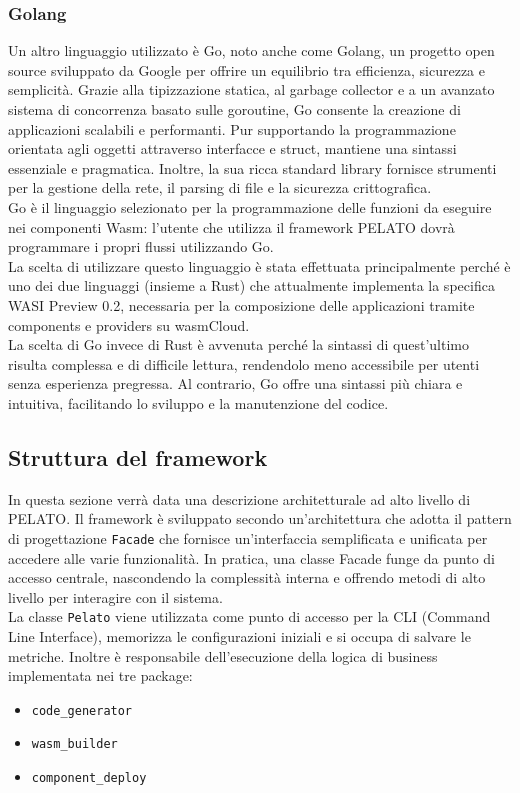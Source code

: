 \subsubsection{Golang}

Un altro linguaggio utilizzato è Go, noto anche come Golang, un progetto open source sviluppato da Google per offrire un equilibrio tra efficienza, sicurezza e semplicità. Grazie alla tipizzazione statica, al garbage collector e a un avanzato sistema di concorrenza basato sulle goroutine, Go consente la creazione di applicazioni scalabili e performanti. Pur supportando la programmazione orientata agli oggetti attraverso interfacce e struct, mantiene una sintassi essenziale e pragmatica. Inoltre, la sua ricca standard library fornisce strumenti per la gestione della rete, il parsing di file e la sicurezza crittografica.\\
Go è il linguaggio selezionato per la programmazione delle funzioni da eseguire nei componenti Wasm:
l'utente che utilizza il framework PELATO dovrà programmare i propri flussi utilizzando Go.\\
La scelta di utilizzare questo linguaggio è stata effettuata principalmente perché è uno dei due linguaggi (insieme a Rust) che attualmente implementa la specifica WASI Preview 0.2, necessaria per la composizione delle applicazioni tramite components e providers su wasmCloud.\\
La scelta di Go invece di Rust è avvenuta perché la sintassi di quest'ultimo risulta complessa e di difficile lettura, rendendolo meno accessibile per utenti senza esperienza pregressa. Al contrario, Go offre una sintassi più chiara e intuitiva, facilitando lo sviluppo e la manutenzione del codice.\\

\subsection{Struttura del framework}

In questa sezione verrà data una descrizione architetturale ad alto livello di PELATO. Il framework è sviluppato secondo un'architettura che adotta il pattern di progettazione \texttt{Facade} che fornisce un'interfaccia semplificata e unificata per accedere alle varie funzionalità. In pratica, una classe Facade funge da punto di accesso centrale, nascondendo la complessità interna e offrendo metodi di alto livello per interagire con il sistema.\\
La classe \texttt{Pelato} viene utilizzata come punto di accesso per la CLI (Command Line Interface), memorizza le configurazioni iniziali e si occupa di salvare le metriche. Inoltre è responsabile dell'esecuzione della logica di business implementata nei tre package:
\begin{itemize}
    \item \texttt{code\_generator}
    \item \texttt{wasm\_builder}
    \item \texttt{component\_deploy}
\end{itemize}

